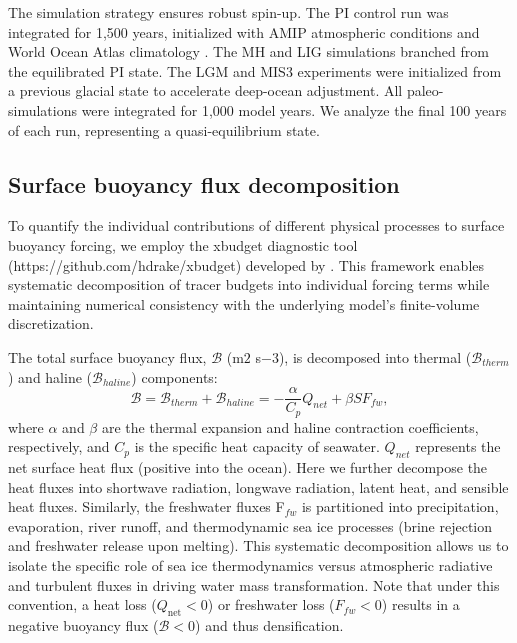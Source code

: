 \documentclass[draft]{agujournal2025}
\begin{document}
The simulation strategy ensures robust spin-up. The PI control run was integrated for 1,500 years, initialized with AMIP atmospheric conditions \citep{roeckner2004atmospheric} and World Ocean Atlas climatology \citep{levitus2010world}. The MH and LIG simulations branched from the equilibrated PI state. The LGM and MIS3 experiments were initialized from a previous glacial state \citep{werner2016glacial} to accelerate deep-ocean adjustment. All paleo-simulations were integrated for 1,000 model years. We analyze the final 100 years of each run, representing a quasi-equilibrium state.


\subsection{Surface buoyancy flux decomposition}


To quantify the individual contributions of different physical processes to surface buoyancy forcing, we employ the xbudget diagnostic tool  (https://github.com/hdrake/xbudget) developed by \citet{drake2025water}. This framework enables systematic decomposition of tracer budgets into individual forcing terms while maintaining numerical consistency with the underlying model's finite-volume discretization.

The total surface buoyancy flux, $\mathcal{B}$ (m$2$ s${-3}$), is decomposed into thermal ($\mathcal{B}_{therm}$) and haline ($\mathcal{B}_{haline}$) components:
\begin{equation}
\mathcal{B} = \mathcal{B}_{therm} + \mathcal{B}_{haline} = -\frac{\alpha}{C_p} Q_{net} + \beta S F_{fw},
\end{equation}
where $\alpha$ and $\beta$ are the thermal expansion and haline contraction coefficients, respectively, and $C_p$ is the specific heat capacity of seawater. $Q_{net}$ represents the net surface heat flux (positive into the ocean). Here we further decompose the heat fluxes into shortwave radiation, longwave radiation, latent heat, and sensible heat fluxes. Similarly, the freshwater fluxes F$_{fw}$ is partitioned into precipitation, evaporation, river runoff, and thermodynamic sea ice processes (brine rejection and freshwater release upon melting). This systematic decomposition allows us to isolate the specific role of sea ice thermodynamics versus atmospheric radiative and turbulent fluxes in driving water mass transformation. Note that under this convention, a heat loss ($Q_{\text{net}} < 0$) or freshwater loss ($F_{fw} < 0$) results in a negative buoyancy flux ($\mathcal{B} < 0$) and thus densification.
\end{document}
